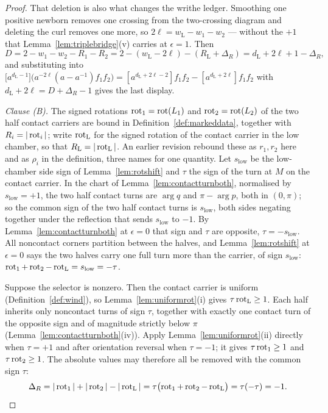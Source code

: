 \begin{proof}
That deletion is also what changes the writhe ledger. Smoothing one positive
newborn removes one crossing from the two-crossing diagram and deleting the
curl removes one more, so $2\ell=w_{\mathrm L}-w_1-w_2$ --- without the $+1$
that Lemma~\ref{lem:triplebridge}(v) carries at $\epsilon=1$. Then
\[
   D=2-w_1-w_2-R_1-R_2
    =2-(w_{\mathrm L}-2\ell)-(R_{\mathrm L}+\Delta_R)
    =d_{\mathrm L}+2\ell+1-\Delta_R,
\]
and substituting into
$\bigl[a^{d_{\mathrm L}-1}\bigr]\bigl(a^{-2\ell}(a-a^{-1})f_1f_2\bigr)
=[a^{d_{\mathrm L}+2\ell-2}]f_1f_2-[a^{d_{\mathrm L}+2\ell}]f_1f_2$
with $d_{\mathrm L}+2\ell=D+\Delta_R-1$ gives the last display.

\emph{Clause (B).} The signed rotations $\operatorname{rot}_1=\operatorname{rot}(L_1)$ and $\operatorname{rot}_2=\operatorname{rot}(L_2)$ of the two half
contact carriers are bound in Definition~\ref{def:markeddata}, together with
$R_i=|\operatorname{rot}_i|$; write $\operatorname{rot}_{\mathrm L}$ for the signed rotation of the contact
carrier in the low chamber, so that $R_{\mathrm L}=|\operatorname{rot}_{\mathrm L}|$. An
earlier revision rebound these as $r_1,r_2$ here and as $\rho_i$ in the
definition, three names for one quantity. Let $s_{\mathrm{low}}$ be
the low-chamber side sign of Lemma~\ref{lem:rotshift} and $\tau$ the sign of the
turn at $M$ on the contact carrier. In the chart of Lemma~\ref{lem:contactturnboth}, normalised by
$s_{\mathrm{low}}=+1$, the two half contact turns are $\arg q$ and
$\pi-\arg p$, both in $(0,\pi)$; so the common sign of the two half contact
turns is $s_{\mathrm{low}}$, both sides negating together under the reflection
that sends $s_{\mathrm{low}}$ to $-1$. By Lemma~\ref{lem:contactturnboth} at
$\epsilon=0$ that sign and $\tau$ are opposite, $\tau=-s_{\mathrm{low}}$. All
noncontact corners partition between the halves, and
Lemma~\ref{lem:rotshift} at $\epsilon=0$ says the two halves carry one full
turn more than the carrier, of sign $s_{\mathrm{low}}$:
$\operatorname{rot}_1+\operatorname{rot}_2-\operatorname{rot}_{\mathrm L}=s_{\mathrm{low}}=-\tau$.

Suppose the selector is nonzero. Then the contact carrier is uniform
(Definition~\ref{def:wind}), so Lemma~\ref{lem:uniformrot}(i) gives
$\tau\operatorname{rot}_{\mathrm L}\geq1$. Each half inherits only noncontact turns of sign
$\tau$, together with exactly one contact turn of the opposite sign and of
magnitude strictly below $\pi$ (Lemma~\ref{lem:contactturnboth}(iv)). Apply
Lemma~\ref{lem:uniformrot}(ii) directly when $\tau=+1$ and after orientation
reversal when $\tau=-1$; it gives
$\tau\operatorname{rot}_1\geq1$ and $\tau\operatorname{rot}_2\geq1$. The absolute values may therefore all be
removed with the common sign $\tau$:
\[
   \Delta_R=|\operatorname{rot}_1|+|\operatorname{rot}_2|-|\operatorname{rot}_{\mathrm L}|
   =\tau\bigl(\operatorname{rot}_1+\operatorname{rot}_2-\operatorname{rot}_{\mathrm L}\bigr)=\tau(-\tau)=-1 .
\]
\end{proof}

